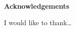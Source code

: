 \newpage

{\centering \sffamily \bfseries \large Acknowledgements \\ [24pt]}

I would like to thank\ldots
